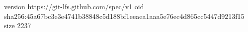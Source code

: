 version https://git-lfs.github.com/spec/v1
oid sha256:45a67bc3e3e4741b38848c5d188bf1eeaea1aaa5e76ec4d865cc5447d9213f15
size 2237
